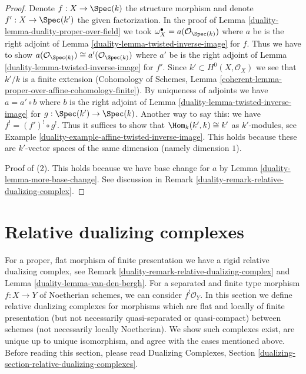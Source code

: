 \begin{proof}

Denote $f : X \to \Spec(k)$ the structure morphism and denote
$f' : X \to \Spec(k')$ the given factorization.
In the proof of Lemma \ref{duality-lemma-duality-proper-over-field}
we took $\omega_X^\bullet = a(\mathcal{O}_{\Spec(k)})$
where $a$ be is the right adjoint of
Lemma \ref{duality-lemma-twisted-inverse-image} for $f$.
Thus we have to show
$a(\mathcal{O}_{\Spec(k)}) \cong a'(\mathcal{O}_{\Spec(k)})$
where $a'$ be is the right adjoint of
Lemma \ref{duality-lemma-twisted-inverse-image} for $f'$.
Since $k' \subset H^0(X, \mathcal{O}_X)$ we see that $k'/k$ is a finite
extension (Cohomology of Schemes, Lemma
\ref{coherent-lemma-proper-over-affine-cohomology-finite}).
By uniqueness of adjoints we have $a = a' \circ b$ where
$b$ is the right adjoint of Lemma
\ref{duality-lemma-twisted-inverse-image} for $g : \Spec(k') \to \Spec(k)$.
Another way to say this: we have $f^! = (f')^! \circ g^!$.
Thus it suffices to show that $\Hom_k(k', k) \cong k'$ as
$k'$-modules, see Example \ref{duality-example-affine-twisted-inverse-image}.
This holds because these are $k'$-vector spaces of
the same dimension (namely dimension $1$).

\medskip\noindent
Proof of (2). This holds because we have base change for $a$ by
Lemma \ref{duality-lemma-more-base-change}. See discussion in
Remark \ref{duality-remark-relative-dualizing-complex}.
\end{proof}

\section{Relative dualizing complexes}
\label{duality-section-relative-dualizing-complexes}
For a proper, flat morphism of finite presentation we have a
rigid relative dualizing complex, see
Remark \ref{duality-remark-relative-dualizing-complex} and
Lemma \ref{duality-lemma-van-den-bergh}. For a separated and finite type
morphism $f : X \to Y$ of Noetherian schemes, we can consider
$f^!\mathcal{O}_Y$. In this section we define relative dualizing complexes
for morphisms which are flat and locally of finite presentation
(but not necessarily quasi-separated or quasi-compact) between
schemes (not necessarily locally Noetherian).
We show such complexes exist, are unique up to unique
isomorphism, and agree with the cases mentioned above.
Before reading this section, please read
Dualizing Complexes, Section
\ref{dualizing-section-relative-dualizing-complexes}.

